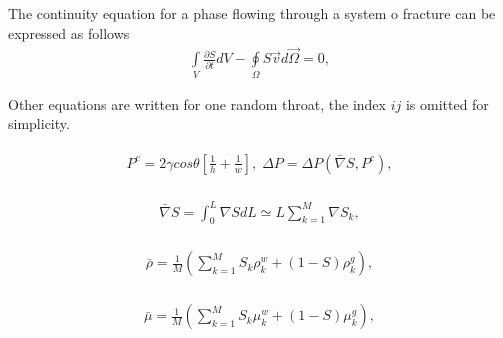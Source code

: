 \documentclass[a4paper,12pt]{extreport}
\begin{document}
  The continuity equation for a phase flowing through a system o fracture can be expressed as follows
  \begin{eqnarray}
  \label{eq:two_phase_integral}
  \int \limits_{V} \frac{\partial S}{\partial t} d V - \oint \limits_{\Omega} S \vec{v} d\vec{\Omega} = 0,
  \end{eqnarray}
  
  Other equations are written for one random throat, the index $ij$ is omitted for simplicity.
 
  \begin{eqnarray}
  \begin{gathered}
  \label{eq:capillary_pressure_fractures}
  P^{c} = 2 \gamma cos \theta \left[\frac{1}{h} + \frac{1}{w}\right], \; \Delta P = \Delta P \left(\bar{\nabla} S, P^c\right),
  \end{gathered}
  \end{eqnarray}
  
  \begin{eqnarray}
  \begin{gathered}
  \bar{\nabla} S = \int_{0}^{L} \nabla S dL \simeq L \sum_{k=1}^{M} \nabla S_{k},
  \end{gathered}
  \end{eqnarray}

  \begin{eqnarray}
  \begin{gathered}
  \bar{\rho} = \frac{1}{M}\left(\sum_{k=1}^M S_{k} \rho_k^w+ \left(1-S\right) \rho_k^g\right),
  \end{gathered}
  \end{eqnarray}
  
  \begin{eqnarray}
  \begin{gathered}
  \bar{\mu} = \frac{1}{M}\left(\sum_{k=1}^M S_{k} \mu_k^w+ \left(1-S\right) \mu_k^g\right),
  \end{gathered}
  \end{eqnarray}
\end{document}
